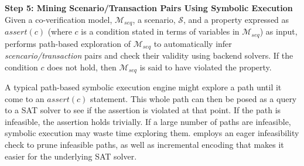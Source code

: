 \textbf{Step 5: Mining Scenario/Transaction Pairs Using Symbolic Execution}
Given a co-verification model, $\mathcal{M}_{seq}$, a scenario, 
$\mathcal{S}$, and a property expressed as $\mathit{assert}(c)$ 
(where $c$ is a condition stated in terms of variables in $\mathcal{M}_{seq}$)
as input, \verifox performs path-based exploration of $\mathcal{M}_{seq}$ 
to automatically infer {\em scencario/transaction} pairs and check their validity 
using backend solvers. If the condition $c$ does not hold, 
then $\mathcal{M}_{seq}$ is said to have violated the property. 


A typical path-based symbolic execution engine might explore 
a path until it come to an $\mathit{assert}(c)$ statement.
This whole path can then be posed as a query to a SAT solver to see if the 
assertion is violated at that point. If the path is infeasible, the assertion
holds trivially. If a large number of paths are infeasible, symbolic 
execution may waste time exploring them. \verifox employs 
an eager infeasibility check to prune infeasible paths, 
as well as incremental encoding that makes
it easier for the underlying SAT solver. 
